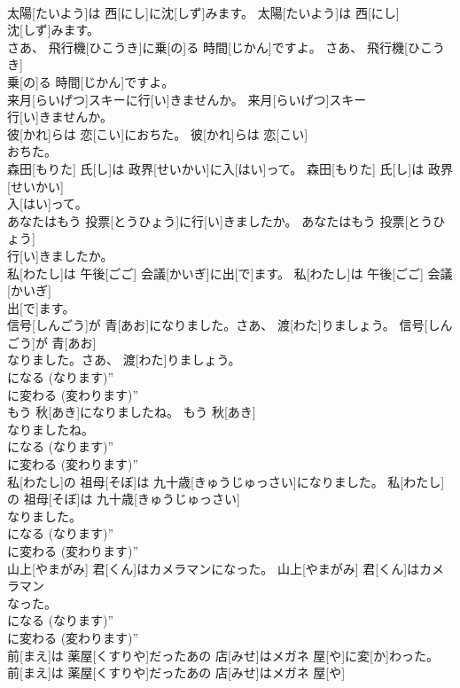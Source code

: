 \documentclass[8pt]{extreport}
\begin{document}
\begin{CJK}{UTF8}{min}
\\	太陽[たいよう]は 西[にし]に沈[しず]みます。	太陽[たいよう]は 西[にし]
\\	沈[しず]みます。	
\\	さあ、 飛行機[ひこうき]に乗[の]る 時間[じかん]ですよ。	さあ、 飛行機[ひこうき]
\\	乗[の]る 時間[じかん]ですよ。	
\\	来月[らいげつ]スキーに行[い]きませんか。	来月[らいげつ]スキー
\\	行[い]きませんか。	
\\	彼[かれ]らは 恋[こい]におちた。	彼[かれ]らは 恋[こい]
\\	おちた。	
\\	森田[もりた] 氏[し]は 政界[せいかい]に入[はい]って。	森田[もりた] 氏[し]は 政界[せいかい]
\\	入[はい]って。	
\\	あなたはもう 投票[とうひょう]に行[い]きましたか。	あなたはもう 投票[とうひょう]
\\	行[い]きましたか。	
\\	私[わたし]は 午後[ごご] 会議[かいぎ]に出[で]ます。	私[わたし]は 午後[ごご] 会議[かいぎ]
\\	出[で]ます。	
\\	信号[しんごう]が 青[あお]になりました。さあ、 渡[わた]りましょう。	信号[しんごう]が 青[あお]
\\	なりました。さあ、 渡[わた]りましょう。	
\\	になる (なります)” 
\\	に変わる (変わります)”
\\	もう 秋[あき]になりましたね。	もう 秋[あき]
\\	なりましたね。	
\\	になる (なります)” 
\\	に変わる (変わります)”
\\	私[わたし]の 祖母[そぼ]は 九十歳[きゅうじゅっさい]になりました。	私[わたし]の 祖母[そぼ]は 九十歳[きゅうじゅっさい]
\\	なりました。	
\\	になる (なります)” 
\\	に変わる (変わります)”
\\	山上[やまがみ] 君[くん]はカメラマンになった。	山上[やまがみ] 君[くん]はカメラマン
\\	なった。	
\\	になる (なります)” 
\\	に変わる (変わります)”
\\	前[まえ]は 薬屋[くすりや]だったあの 店[みせ]はメガネ 屋[や]に変[か]わった。	前[まえ]は 薬屋[くすりや]だったあの 店[みせ]はメガネ 屋[や]

\end{CJK}
\end{document}
